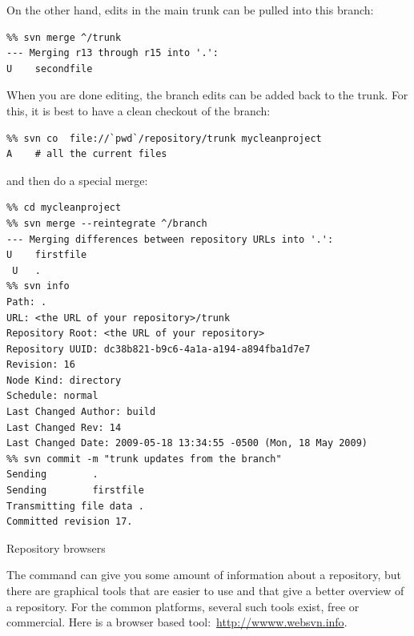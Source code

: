 On the other hand, edits in the main trunk can be pulled into this
branch:
\begin{verbatim}
%% svn merge ^/trunk
--- Merging r13 through r15 into '.':
U    secondfile
\end{verbatim}
When you are done editing, the branch edits can be added back to the
trunk. For this, it is best to have a clean checkout of the branch:
\begin{verbatim}
%% svn co  file://`pwd`/repository/trunk mycleanproject
A    # all the current files
\end{verbatim}
and then do a special merge:
\begin{verbatim}
%% cd mycleanproject
%% svn merge --reintegrate ^/branch
--- Merging differences between repository URLs into '.':
U    firstfile
 U   .
%% svn info
Path: .
URL: <the URL of your repository>/trunk
Repository Root: <the URL of your repository>
Repository UUID: dc38b821-b9c6-4a1a-a194-a894fba1d7e7
Revision: 16
Node Kind: directory
Schedule: normal
Last Changed Author: build
Last Changed Rev: 14
Last Changed Date: 2009-05-18 13:34:55 -0500 (Mon, 18 May 2009)
%% svn commit -m "trunk updates from the branch"
Sending        .
Sending        firstfile
Transmitting file data .
Committed revision 17.
\end{verbatim}

 {Repository browsers}

The  command can give you some amount of information about a
repository, but there are graphical tools that are easier to use and
that give a better overview of a repository. For the common platforms,
several such tools exist, free or commercial. Here is a browser based
tool:~\url{http://wwww.websvn.info}.



